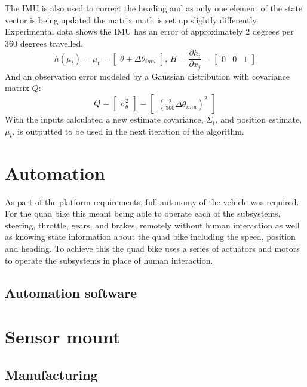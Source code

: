 \documentclass[main.tex]{subfiles}
\begin{document}
The IMU is also used to correct the heading and as only one element of the state vector is being updated the matrix math is set up slightly differently. Experimental data shows the IMU has an error of approximately 2 degrees per 360 degrees travelled. 
\[
h(\mu_t) = \mu_t = 
\begin{bmatrix}
    \theta + \Delta \theta_{imu}
\end{bmatrix}
\textrm{, } H = \frac{\partial h_i}{\partial x_j} = 
\begin{bmatrix}
    0	&	0	&	1
\end{bmatrix}
\]
And an observation error modeled by a Gaussian distribution with covariance matrix $Q$:
\[
Q = 
\begin{bmatrix}
    \sigma_\theta^2
\end{bmatrix}
=
\begin{bmatrix}
    (\frac{2}{360}\Delta \theta_{imu})^2
\end{bmatrix}
\]
With the inputs calculated a new estimate covariance, $\Sigma_t$, and position estimate, $\mu_t$, is outputted to be used in the next iteration of the algorithm. 

\section{Automation}

As part of the platform requirements, full autonomy of the vehicle was required. For the quad bike this meant being able to operate each of the subsystems, steering, throttle, gears, and brakes, remotely without human interaction as well as knowing state information about the quad bike including the speed, position and heading. To achieve this the quad bike uses a series of actuators and motors to operate the subsystems in place of human interaction.

\subsection{Automation software}

\section{Sensor mount}
\subsection{Manufacturing}
\end{document}
